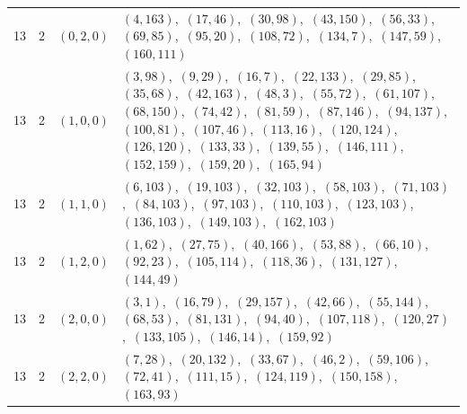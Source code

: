 \documentclass[11pt]{article}
\begin{document}
\begin{longtable}{@{}rrl>{\raggedright\arraybackslash}p{}@{}}
13 & 2 & $(0,2,0)$ & $(4,163)$,\allowbreak\ $(17,46)$,\allowbreak\ $(30,98)$,\allowbreak\ $(43,150)$,\allowbreak\ $(56,33)$,\allowbreak\ $(69,85)$,\allowbreak\ $(95,20)$,\allowbreak\ $(108,72)$,\allowbreak\ $(134,7)$,\allowbreak\ $(147,59)$,\allowbreak\ $(160,111)$\\
13 & 2 & $(1,0,0)$ & $(3,98)$,\allowbreak\ $(9,29)$,\allowbreak\ $(16,7)$,\allowbreak\ $(22,133)$,\allowbreak\ $(29,85)$,\allowbreak\ $(35,68)$,\allowbreak\ $(42,163)$,\allowbreak\ $(48,3)$,\allowbreak\ $(55,72)$,\allowbreak\ $(61,107)$,\allowbreak\ $(68,150)$,\allowbreak\ $(74,42)$,\allowbreak\ $(81,59)$,\allowbreak\ $(87,146)$,\allowbreak\ $(94,137)$,\allowbreak\ $(100,81)$,\allowbreak\ $(107,46)$,\allowbreak\ $(113,16)$,\allowbreak\ $(120,124)$,\allowbreak\ $(126,120)$,\allowbreak\ $(133,33)$,\allowbreak\ $(139,55)$,\allowbreak\ $(146,111)$,\allowbreak\ $(152,159)$,\allowbreak\ $(159,20)$,\allowbreak\ $(165,94)$\\
13 & 2 & $(1,1,0)$ & $(6,103)$,\allowbreak\ $(19,103)$,\allowbreak\ $(32,103)$,\allowbreak\ $(58,103)$,\allowbreak\ $(71,103)$,\allowbreak\ $(84,103)$,\allowbreak\ $(97,103)$,\allowbreak\ $(110,103)$,\allowbreak\ $(123,103)$,\allowbreak\ $(136,103)$,\allowbreak\ $(149,103)$,\allowbreak\ $(162,103)$\\
13 & 2 & $(1,2,0)$ & $(1,62)$,\allowbreak\ $(27,75)$,\allowbreak\ $(40,166)$,\allowbreak\ $(53,88)$,\allowbreak\ $(66,10)$,\allowbreak\ $(92,23)$,\allowbreak\ $(105,114)$,\allowbreak\ $(118,36)$,\allowbreak\ $(131,127)$,\allowbreak\ $(144,49)$\\
13 & 2 & $(2,0,0)$ & $(3,1)$,\allowbreak\ $(16,79)$,\allowbreak\ $(29,157)$,\allowbreak\ $(42,66)$,\allowbreak\ $(55,144)$,\allowbreak\ $(68,53)$,\allowbreak\ $(81,131)$,\allowbreak\ $(94,40)$,\allowbreak\ $(107,118)$,\allowbreak\ $(120,27)$,\allowbreak\ $(133,105)$,\allowbreak\ $(146,14)$,\allowbreak\ $(159,92)$\\
13 & 2 & $(2,2,0)$ & $(7,28)$,\allowbreak\ $(20,132)$,\allowbreak\ $(33,67)$,\allowbreak\ $(46,2)$,\allowbreak\ $(59,106)$,\allowbreak\ $(72,41)$,\allowbreak\ $(111,15)$,\allowbreak\ $(124,119)$,\allowbreak\ $(150,158)$,\allowbreak\ $(163,93)$\\

\end{longtable}
\end{document}
